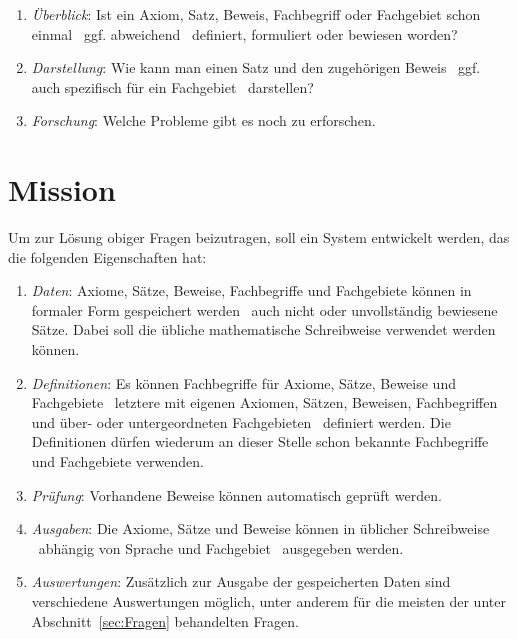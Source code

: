 \documentclass[english,ngerman,parskip=half,headsepline,footsepline]{scrreprt}
\newcounter{Enumi}
\begin{document}
\begin{enumerate}
		\item \label{Frage:Überblick} \emph{Überblick}: Ist ein Axiom, Satz, Beweis, Fachbegriff oder Fachgebiet schon einmal \textendash\ ggf. abweichend \textendash\ definiert, formuliert oder bewiesen worden?
		
		\item \label{Frage:Darstellung} \emph{Darstellung}: Wie kann man einen Satz und den zugehörigen Beweis \textendash\ ggf. auch spezifisch für ein Fachgebiet \textendash\ darstellen?
		
		\item \label{Frage:Forschung} \emph{Forschung}: Welche Probleme gibt es noch zu erforschen.
		
	\end{enumerate}
	
	\section{Mission}
	\label{sec:Mission}
	Um zur Lösung obiger Fragen beizutragen, soll ein System entwickelt werden, das die folgenden Eigenschaften hat:
	
	\begin{enumerate}
		
		\item \label{Mission:Daten} \emph{Daten}: Axiome, Sätze, Beweise, Fachbegriffe und Fachgebiete können in formaler Form gespeichert werden \textendash\ auch nicht oder unvollständig bewiesene Sätze. Dabei soll die übliche mathematische Schreibweise verwendet werden können.
		
		\item \label{Mission:Definitionen} \emph{Definitionen}: Es können Fachbegriffe für Axiome, Sätze, Beweise und Fachgebiete \textendash\ letztere mit eigenen Axiomen, Sätzen, Beweisen, Fachbegriffen und über- oder untergeordneten Fachgebieten \textendash\ definiert werden. Die Definitionen dürfen wiederum an dieser Stelle schon bekannte Fachbegriffe und Fachgebiete verwenden.
		
		\item \label{Mission:Prüfung} \emph{Prüfung}: Vorhandene Beweise können automatisch geprüft werden.
		
		\item \label{Mission:Ausgaben} \emph{Ausgaben}: Die Axiome, Sätze und Beweise können in üblicher Schreibweise \textendash\ abhängig von Sprache und Fachgebiet \textendash\ ausgegeben werden.
		
		\item \label{Mission:Auswertungen} \emph{Auswertungen}: Zusätzlich zur Ausgabe der gespeicherten Daten sind verschiedene Auswertungen möglich, unter anderem für die meisten der unter Abschnitt~\vref{sec:Fragen} behandelten Fragen.
		
		\setcounter{Enumi}{\value{enumi}}
	\end{enumerate}
\end{document}
